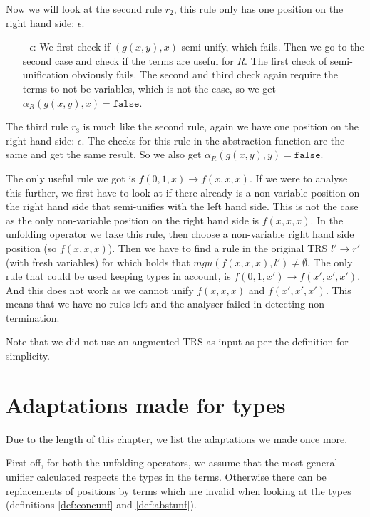 Now we will look at the second rule $r_2$, this rule only has one position on the right hand side: $\epsilon$.
\begin{itemize}
    \itemsep 0em
    \item[-] $\epsilon$: We first check if $(g(x, y), x)$ semi-unify, which fails. Then we go to the second case and check if the terms are useful for $R$. The first check of semi-unification obviously fails. The second and third check again require the terms to not be variables, which is not the case, so we get $\alpha_R(g(x,y), x) = \texttt{false}$.
\end{itemize}
The third rule $r_3$ is much like the second rule, again we have one position on the right hand side: $\epsilon$. The checks for this rule in the abstraction function are the same and get the same result. So we also get $\alpha_R(g(x,y), y) = \texttt{false}$.

\noindent The only useful rule we got is $f(0, 1, x) \rightarrow f(x,x,x)$. If we were to analyse this further, we first have to look at if there already is a non-variable position on the right hand side that semi-unifies with the left hand side. This is not the case as the only non-variable position on the right hand side is $f(x, x, x)$. In the unfolding operator we take this rule, then choose a non-variable right hand side position (so $f(x,x,x)$). Then we have to find a rule in the original TRS $l' \rightarrow r'$ (with fresh variables) for which holds that $\textit{mgu}(f(x,x,x), l') \neq \emptyset$. The only rule that could be used keeping types in account, is $f(0, 1, x') \rightarrow f(x', x', x')$. And this does not work as we cannot unify $f(x,x,x)$ and $f(x', x', x')$. This means that we have no rules left and the analyser failed in detecting non-termination. 

Note that we did not use an augmented TRS as input as per the definition for simplicity. 

\section{Adaptations made for types}
Due to the length of this chapter, we list the adaptations we made once more.  

First off, for both the unfolding operators, we assume that the most general unifier calculated respects the types in the terms. Otherwise there can be replacements of positions by terms which are invalid when looking at the types (definitions \ref{def:concunf} and \ref{def:abstunf}).

